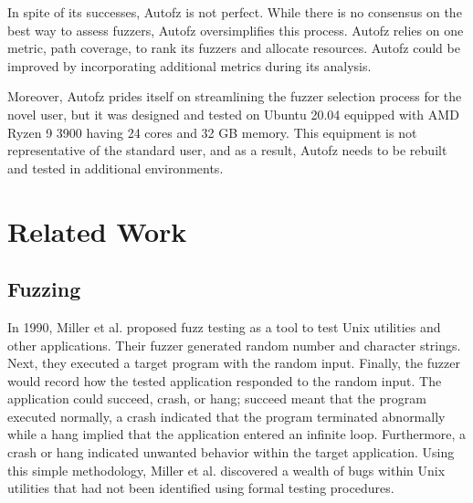 In spite of its successes, Autofz is not perfect. While there is no consensus on
the best way to assess fuzzers, Autofz oversimplifies this process. Autofz relies
on one metric, path coverage, to rank its fuzzers and allocate resources. Autofz 
could be improved by incorporating additional metrics during its analysis. 

Moreover, Autofz prides itself on streamlining the fuzzer selection process for 
the novel user, but it was designed and tested on Ubuntu 20.04 equipped with AMD 
Ryzen 9 3900 having 24 cores and 32 GB memory. This equipment is not representative 
of the standard user, and as a result, Autofz needs to be rebuilt and tested in 
additional environments. \cite{Fu}

\section{Related Work}

\subsection{Fuzzing}
In 1990, Miller et al. proposed fuzz testing as a tool to test Unix utilities 
and other applications. Their fuzzer generated random number and character 
strings. Next, they executed a target program with the random input. Finally, 
the fuzzer would record how the tested application responded to the random input. 
The application could succeed, crash, or hang; succeed meant that the program 
executed normally, a crash indicated that the program terminated abnormally while 
a hang implied that the application entered an infinite loop. Furthermore, a 
crash or hang indicated unwanted behavior within the target application. Using this 
simple methodology, Miller et al. discovered a wealth of bugs within Unix utilities 
that had not been identified using formal testing procedures. \cite{Miller}


